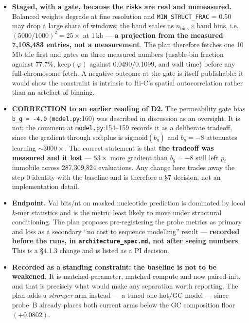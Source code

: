 \documentclass[11pt,a4paper]{article}
\newcommand{\code}[1]{\texttt{\small #1}}
\begin{document}
\begin{itemize}
\item \textbf{Staged, with a gate, because the risks are real and unmeasured.}
Balanced weights degrade at fine resolution and \code{MIN\_STRUCT\_FRAC} = 0.50
may drop a large share of windows; the band scales as
$n_{\text{bins}} \times \text{band bins}$, i.e.\ $(5000/1000)^2 = 25\times$ at
1\,kb --- \textbf{a projection from the measured 7{,}108{,}483 entries, not a
measurement}. The plan therefore fetches one 10\,Mb tile first and gates on
three measured numbers (usable-bin fraction against 77.7\%,
$\mathrm{keep}(\varphi)$ against 0.0490/0.1099, and wall time) before any
full-chromosome fetch. A negative outcome at the gate is itself publishable: it
would show the constraint is intrinsic to Hi-C's spatial autocorrelation rather
than an artefact of binning.

\item \textbf{CORRECTION to an earlier reading of D2.} The permeability gate
bias \code{b\_g = -4.0} (\code{model.py}:160) was described in discussion as an
oversight. It is not: the comment at \code{model.py}:154--159 records it as a
deliberate tradeoff, since the gradient through softplus is
$\mathrm{sigmoid}(b_g)$ and $b_g = -8$ attenuates learning ${\sim}3000\times$.
The correct statement is that \textbf{the tradeoff was measured and it lost} ---
$53\times$ more gradient than $b_g = -8$ still left $p_t$ immobile across
287{,}309{,}824 evaluations. Any change here trades away the step-0 identity
with the baseline and is therefore a \S7 decision, not an implementation
detail.

\item \textbf{Endpoint.} Val bits/nt on masked nucleotide prediction is
dominated by local $k$-mer statistics and is the metric least likely to move
under structural conditioning. The plan proposes pre-registering the probe
metrics as primary and loss as a secondary ``no cost to sequence modelling''
result --- \textbf{recorded before the runs, in \code{architecture\_spec.md},
not after seeing numbers}. This is a \S4.1.3 change and is listed as a PI
decision.

\item \textbf{Recorded as a standing constraint: the baseline is not to be
weakened.} It is matched-parameter, matched-compute and now paired-init, and
that is precisely what would make any separation worth reporting. The plan adds
a \emph{stronger} arm instead --- a tuned one-hot/GC model --- since probe~B
already places both current arms below the GC composition floor $(+0.0802)$.

\end{itemize}
\end{document}
